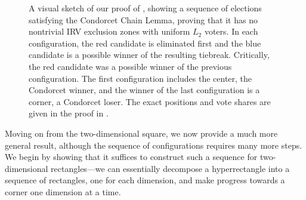 \documentclass{article}
\theoremstyle{theorem}
\theoremstyle{definition}
\begin{document}
\begin{figure}[t]
 \quad \raisebox{6.7mm}{$\rightarrow$}\quad
\caption{A visual sketch of our proof of , showing a sequence of elections satisfying the Condorcet Chain Lemma, proving that it has no nontrivial IRV exclusion zones with uniform $L_2$ voters. In each configuration, the red candidate is eliminated first and the blue candidate is a possible winner of the resulting tiebreak. Critically, the red candidate was a possible winner of the previous configuration. The first configuration includes the center, the Condorcet winner, and the winner of the last configuration is a corner, a Condorcet loser. The exact positions and vote shares are given in the proof in .}\label{fig:square-sequence}
\end{figure}

Moving on from the two-dimensional square, we now provide a much more general result, although the sequence of configurations requires many more steps. We begin by showing that it suffices to construct such a sequence for two-dimensional rectangles---we can essentially decompose a hyperrectangle into a sequence of rectangles, one for each dimension, and make progress towards a corner one dimension at a time. 
\end{document}

